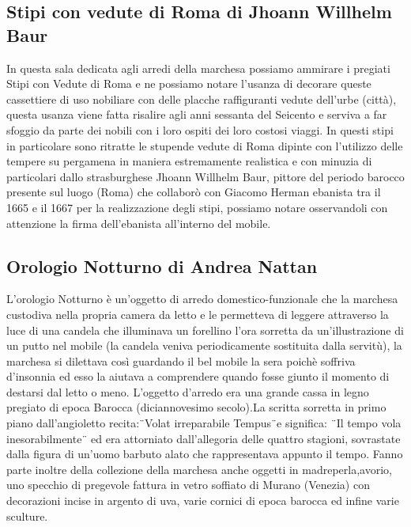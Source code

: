 \documentclass[12pt,a4paper]{article}
\begin{document}
	\subsection{Stipi con vedute di Roma di Jhoann Willhelm Baur}
	In questa sala dedicata agli arredi della marchesa possiamo ammirare i pregiati Stipi con Vedute di Roma e ne possiamo notare l'usanza di decorare queste cassettiere di uso nobiliare con delle placche raffiguranti vedute dell'urbe (città), questa usanza viene fatta risalire agli anni sessanta del Seicento e serviva a far sfoggio da parte dei nobili con i loro ospiti dei loro costosi viaggi. In questi stipi in particolare sono ritratte le stupende vedute di Roma dipinte con l'utilizzo delle tempere su pergamena in maniera estremamente realistica e con minuzia di particolari dallo strasburghese Jhoann Willhelm Baur, pittore del periodo barocco presente sul luogo (Roma) che collaborò con Giacomo Herman ebanista tra il 1665 e il 1667 per la realizzazione degli stipi, possiamo notare osservandoli con attenzione la firma dell'ebanista all'interno del mobile.
	\subsection{Orologio Notturno di Andrea Nattan}
	L'orologio Notturno è un'oggetto di arredo domestico-funzionale che la marchesa custodiva nella propria camera da letto e le permetteva di leggere attraverso la luce di una candela che illuminava un forellino l'ora sorretta da un'illustrazione di un putto nel mobile (la candela veniva periodicamente sostituita dalla servitù), la marchesa si dilettava così guardando il bel mobile la sera poichè soffriva d'insonnia ed esso la aiutava a comprendere quando fosse giunto il momento di destarsi dal letto o meno. L'oggetto d'arredo era una grande cassa in legno pregiato di epoca Barocca (diciannovesimo secolo).La scritta sorretta in primo piano dall'angioletto recita:¨Volat irreparabile Tempus¨e significa: ¨Il tempo vola inesorabilmente¨ ed era attorniato dall'allegoria delle quattro stagioni, sovrastate dalla figura di un'uomo barbuto alato che rappresentava appunto il tempo.
	Fanno parte inoltre della collezione della marchesa anche oggetti in madreperla,avorio, uno specchio di pregevole fattura in vetro soffiato di Murano (Venezia) con decorazioni incise in argento di uva, varie cornici di epoca barocca ed infine varie sculture.
\end{document}
